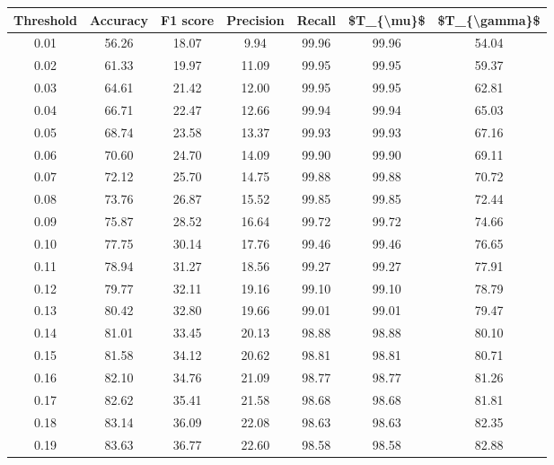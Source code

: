 \begin{tabular}{|c|c|c|c|c|c|c|}
\toprule
 Threshold &  Accuracy &  F1 score &  Precision &  Recall &  \$T\_\{\textbackslash mu\}\$ &  \$T\_\{\textbackslash gamma\}\$ \\
\hline
      0.01 &     56.26 &     18.07 &       9.94 &   99.96 &      99.96 &         54.04 \\
      0.02 &     61.33 &     19.97 &      11.09 &   99.95 &      99.95 &         59.37 \\
      0.03 &     64.61 &     21.42 &      12.00 &   99.95 &      99.95 &         62.81 \\
      0.04 &     66.71 &     22.47 &      12.66 &   99.94 &      99.94 &         65.03 \\
      0.05 &     68.74 &     23.58 &      13.37 &   99.93 &      99.93 &         67.16 \\
      0.06 &     70.60 &     24.70 &      14.09 &   99.90 &      99.90 &         69.11 \\
      0.07 &     72.12 &     25.70 &      14.75 &   99.88 &      99.88 &         70.72 \\
      0.08 &     73.76 &     26.87 &      15.52 &   99.85 &      99.85 &         72.44 \\
      0.09 &     75.87 &     28.52 &      16.64 &   99.72 &      99.72 &         74.66 \\
      0.10 &     77.75 &     30.14 &      17.76 &   99.46 &      99.46 &         76.65 \\
      0.11 &     78.94 &     31.27 &      18.56 &   99.27 &      99.27 &         77.91 \\
      0.12 &     79.77 &     32.11 &      19.16 &   99.10 &      99.10 &         78.79 \\
      0.13 &     80.42 &     32.80 &      19.66 &   99.01 &      99.01 &         79.47 \\
      0.14 &     81.01 &     33.45 &      20.13 &   98.88 &      98.88 &         80.10 \\
      0.15 &     81.58 &     34.12 &      20.62 &   98.81 &      98.81 &         80.71 \\
      0.16 &     82.10 &     34.76 &      21.09 &   98.77 &      98.77 &         81.26 \\
      0.17 &     82.62 &     35.41 &      21.58 &   98.68 &      98.68 &         81.81 \\
      0.18 &     83.14 &     36.09 &      22.08 &   98.63 &      98.63 &         82.35 \\
      0.19 &     83.63 &     36.77 &      22.60 &   98.58 &      98.58 &         82.88 \\

\end{tabular}
